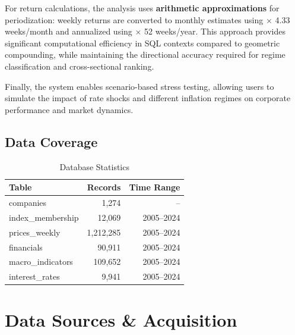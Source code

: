 \documentclass[10pt,a4paper]{article}
\begin{document}
For return calculations, the analysis uses \textbf{arithmetic approximations} for periodization: weekly returns are converted to monthly estimates using $\times$ 4.33 weeks/month and annualized using $\times$ 52 weeks/year. This approach provides significant computational efficiency in SQL contexts compared to geometric compounding, while maintaining the directional accuracy required for regime classification and cross-sectional ranking.

Finally, the system enables scenario-based stress testing, allowing users to simulate the impact of rate shocks and different inflation regimes on corporate performance and market dynamics.

\subsection{Data Coverage}
\begin{table}[H]
\centering
\caption{Database Statistics}
\begin{tabular}{lrr}
\toprule
\textbf{Table} & \textbf{Records} & \textbf{Time Range} \\
\midrule
companies & 1,274 & -- \\
index\_membership & 12,069 & 2005--2024 \\
prices\_weekly & 1,212,285 & 2005--2024 \\
financials & 90,911 & 2005--2024 \\
macro\_indicators & 109,652 & 2005--2024 \\
interest\_rates & 9,941 & 2005--2024 \\
\bottomrule
\end{tabular}
\end{table}

\section{Data Sources \& Acquisition}
\end{document}
